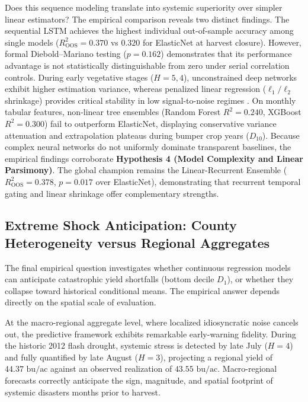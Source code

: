 Does this sequence modeling translate into systemic superiority over simpler linear estimators? The empirical comparison reveals two distinct findings. The sequential LSTM achieves the highest individual out-of-sample accuracy among single models ($R^2_{\text{OOS}} = 0.370$ vs $0.320$ for ElasticNet at harvest closure). However, formal Diebold--Mariano testing ($p = 0.162$) demonstrates that its performance advantage is not statistically distinguishable from zero under serial correlation controls. During early vegetative stages ($H=5, 4$), unconstrained deep networks exhibit higher estimation variance, whereas penalized linear regression ($\ell_1/\ell_2$ shrinkage) provides critical stability in low signal-to-noise regimes \citep{James2023}. On monthly tabular features, non-linear tree ensembles (Random Forest $R^2 = 0.240$, XGBoost $R^2 = 0.300$) fail to outperform ElasticNet, displaying conservative variance attenuation and extrapolation plateaus during bumper crop years ($D_{10}$). Because complex neural networks do not uniformly dominate transparent baselines, the empirical findings corroborate \textbf{Hypothesis 4 (Model Complexity and Linear Parsimony)}. The global champion remains the Linear-Recurrent Ensemble ($R^2_{\text{OOS}} = 0.378$, $p = 0.017$ over ElasticNet), demonstrating that recurrent temporal gating and linear shrinkage offer complementary strengths.

\subsection{Extreme Shock Anticipation: County Heterogeneity versus Regional Aggregates}
The final empirical question investigates whether continuous regression models can anticipate catastrophic yield shortfalls (bottom decile $D_1$), or whether they collapse toward historical conditional means. The empirical answer depends directly on the spatial scale of evaluation.

At the macro-regional aggregate level, where localized idiosyncratic noise cancels out, the predictive framework exhibits remarkable early-warning fidelity. During the historic 2012 flash drought, systemic stress is detected by late July ($H=4$) and fully quantified by late August ($H=3$), projecting a regional yield of $44.37\text{ bu/ac}$ against an observed realization of $43.55\text{ bu/ac}$. Macro-regional forecasts correctly anticipate the sign, magnitude, and spatial footprint of systemic disasters months prior to harvest.

